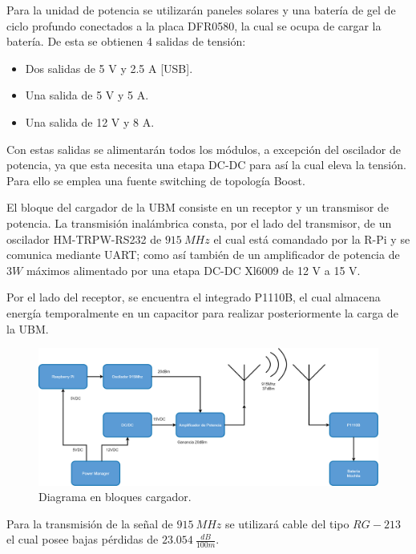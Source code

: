 
Para la unidad de potencia se utilizarán paneles solares y una batería de gel de ciclo profundo conectados a la placa DFR0580, la cual se ocupa de cargar la batería. De esta se obtienen 4 salidas de tensión:
\begin{itemize}
	\item Dos salidas de 5 V y 2.5 A [USB].
	\item Una salida de 5 V y 5 A.
	\item Una salida de 12 V y 8 A.
\end{itemize}

Con estas salidas se alimentarán todos los módulos, a excepción del oscilador de potencia, ya que esta necesita una etapa DC-DC para así la cual eleva la tensión. Para ello se emplea una fuente switching de topología Boost.


El bloque del cargador de la UBM consiste en un receptor y un transmisor de potencia. La transmisión inalámbrica consta, por el lado del transmisor, de un oscilador HM-TRPW-RS232 de $915 \ MHz$ el cual está comandado por la R-Pi y se comunica mediante UART; como así también de un amplificador de potencia de $3W$ máximos alimentado por una etapa DC-DC Xl6009 de 12 V a 15 V.

Por el lado del receptor, se encuentra el integrado P1110B, el cual almacena energía temporalmente en un capacitor para realizar posteriormente la carga de la UBM.

\begin{figure}[H]
	\centering
	\includegraphics[width=0.9\linewidth]{ImagenesIngenieria de Detalle/EsquemaHardwareAntenas}	
	\caption{Diagrama en bloques cargador.}
	\label{fig:diagrama_hardware_antenas}
\end{figure}

Para la transmisión de la señal de $915 \ MHz$ se utilizará cable del tipo $RG-213$ el cual posee bajas pérdidas de $23.054 \ \frac{dB}{100m}$.

